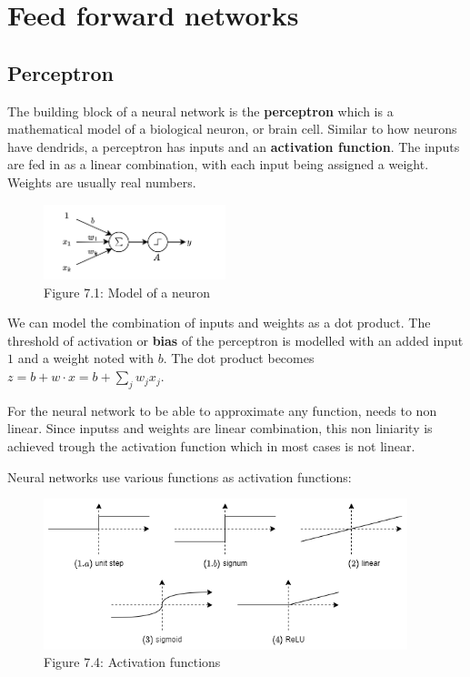 \chapter{Feed forward networks}

\section{Perceptron}

The building block of a neural network is the \textbf{perceptron} which is a mathematical model of a biological neuron, or brain cell. Similar to how neurons have dendrids, a perceptron has inputs and an \textbf{activation function}. The inputs are fed in as a linear combination, with each input being assigned a weight. Weights are usually real numbers.


\begin{figure}[htbp]
    \begin{center}
        \includegraphics[width=150pt]{../img/07-perceptron.png}
        \caption{Figure 7.1: Model of a neuron}
    \end{center}
\end{figure}


We can model the combination of inputs and weights as a dot product. The threshold of activation or \textbf{bias} of the perceptron is modelled with an added input \(1\) and a weight noted with \(b\). The dot product becomes \(z = b + w \cdot x = b + \sum_j w_jx_j\).

For the neural network to be able to approximate any function, needs to non linear. Since inputss and weights are linear combination, this non liniarity is achieved trough the activation function which in most cases is not linear.

Neural networks use various functions as activation functions:


\begin{figure}[htbp]
    \begin{center}
        \includegraphics[width=300pt]{../img/07-activation-functions.png}
        \caption{Figure 7.4: Activation functions}
    \end{center}
\end{figure}


